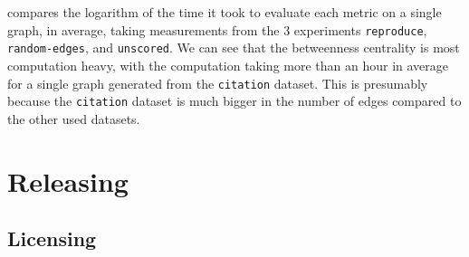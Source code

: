 


 compares the logarithm of the time it took to evaluate each metric on a single graph, in average, taking measurements from the 3 experiments \texttt{reproduce}, \texttt{random-edges}, and \texttt{unscored}.
We can see that the betweenness centrality is most computation heavy, with the computation taking more than an hour in average for a single graph generated from the \texttt{citation} dataset.
This is presumably because the \texttt{citation} dataset is much bigger in the number of edges compared to the other used datasets.







\section{Releasing \graffs}


\subsection{Licensing}
